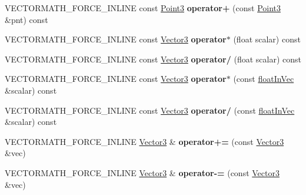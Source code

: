 \begin{DoxyCompactItemize}
V\+E\+C\+T\+O\+R\+M\+A\+T\+H\+\_\+\+F\+O\+R\+C\+E\+\_\+\+I\+N\+L\+I\+NE const \hyperlink{classVectormath_1_1Aos_1_1Point3}{Point3} {\bfseries operator+} (const \hyperlink{classVectormath_1_1Aos_1_1Point3}{Point3} \&pnt) const
\item 
\mbox{\label{classVectormath_1_1Aos_1_1Vector3_a5c83c155da22bc27f0ff7862bd4d7b47}} 
V\+E\+C\+T\+O\+R\+M\+A\+T\+H\+\_\+\+F\+O\+R\+C\+E\+\_\+\+I\+N\+L\+I\+NE const \hyperlink{classVectormath_1_1Aos_1_1Vector3}{Vector3} {\bfseries operator$\ast$} (float scalar) const
\item 
\mbox{\label{classVectormath_1_1Aos_1_1Vector3_a65e208d1aa77e378803063744358b8d7}} 
V\+E\+C\+T\+O\+R\+M\+A\+T\+H\+\_\+\+F\+O\+R\+C\+E\+\_\+\+I\+N\+L\+I\+NE const \hyperlink{classVectormath_1_1Aos_1_1Vector3}{Vector3} {\bfseries operator/} (float scalar) const
\item 
\mbox{\label{classVectormath_1_1Aos_1_1Vector3_a7d68682d95c01f3d1a7633e39325cb7a}} 
V\+E\+C\+T\+O\+R\+M\+A\+T\+H\+\_\+\+F\+O\+R\+C\+E\+\_\+\+I\+N\+L\+I\+NE const \hyperlink{classVectormath_1_1Aos_1_1Vector3}{Vector3} {\bfseries operator$\ast$} (const \hyperlink{classVectormath_1_1floatInVec}{float\+In\+Vec} \&scalar) const
\item 
\mbox{\label{classVectormath_1_1Aos_1_1Vector3_a19d109f8dea0f8eb40af835e71d1b5b5}} 
V\+E\+C\+T\+O\+R\+M\+A\+T\+H\+\_\+\+F\+O\+R\+C\+E\+\_\+\+I\+N\+L\+I\+NE const \hyperlink{classVectormath_1_1Aos_1_1Vector3}{Vector3} {\bfseries operator/} (const \hyperlink{classVectormath_1_1floatInVec}{float\+In\+Vec} \&scalar) const
\item 
\mbox{\label{classVectormath_1_1Aos_1_1Vector3_a8789262444893a359053014901735479}} 
V\+E\+C\+T\+O\+R\+M\+A\+T\+H\+\_\+\+F\+O\+R\+C\+E\+\_\+\+I\+N\+L\+I\+NE \hyperlink{classVectormath_1_1Aos_1_1Vector3}{Vector3} \& {\bfseries operator+=} (const \hyperlink{classVectormath_1_1Aos_1_1Vector3}{Vector3} \&vec)
\item 
\mbox{\label{classVectormath_1_1Aos_1_1Vector3_a20c40d65588b8cd944563e7ccfbfc0cd}} 
V\+E\+C\+T\+O\+R\+M\+A\+T\+H\+\_\+\+F\+O\+R\+C\+E\+\_\+\+I\+N\+L\+I\+NE \hyperlink{classVectormath_1_1Aos_1_1Vector3}{Vector3} \& {\bfseries operator-\/=} (const \hyperlink{classVectormath_1_1Aos_1_1Vector3}{Vector3} \&vec)

\end{DoxyCompactItemize}
